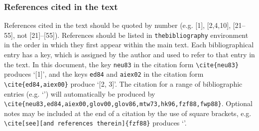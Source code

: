 \documentclass[]{tMAM2e}
\begin{document}
\subsubsection{References cited in the text} References cited in the text should be quoted by number (e.g.
[1], [2,4,10], [21--55], not [21]--[55]). References should be listed in {\tt{thebibliography}} environment in the order in which they first appear within the main text. Each bibliographical entry has a key, which is assigned by the author
and used to refer to that entry in the text. In this document, the key \verb"neu83" in the citation form
\verb"\cite{neu83}" produces `[1]', and the keys \verb"ed84" and \verb"aiex02" in the citation form
\verb"\cite{ed84,aiex00}" produce `[2, 3]'. The citation for a range of bibliographic entries (e.g.
`\cite{neu83,ed84,aiex00,aiex02,glov86,glov00,mtw73,hk96,fzf88,fwp88}') will automatically be produced by
\verb"\cite{neu83,ed84,aiex00,glov00,glov86,mtw73,hk96,fzf88,fwp88}". Optional notes may be included at the end of a citation by the use of square brackets, e.g. \verb"\cite[see][and references therein]{fzf88}" produces `\cite[see][and references therein]{fzf88}'.
\end{document}
